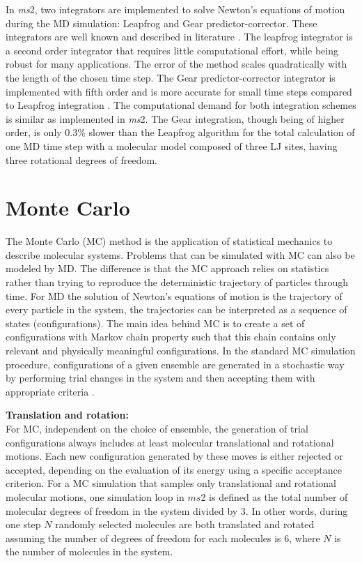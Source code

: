 In \textit{ms}2, two integrators are implemented to solve Newton's equations of motion during the MD simulation: Leapfrog and Gear predictor-corrector. These integrators are well known and described in literature \parencite{Allen}. The leapfrog integrator is a second order integrator that requires little computational effort, while being robust for many applications. The error of the method scales quadratically with the length of the chosen time step. The Gear predictor-corrector integrator is implemented with fifth order and is more accurate for small time steps compared to Leapfrog integration \parencite{Allen}. The computational demand for both integration schemes is similar as implemented in \textit{ms}2. The Gear integration, though being of higher order, is only 0.3\% slower than the Leapfrog algorithm for the total calculation of one MD time step with a molecular model composed of three LJ sites, having three rotational degrees of freedom. 



\section{Monte Carlo}
\label{sec:Monte Carlo}

The Monte Carlo (MC) method is the application of statistical mechanics to describe molecular systems. Problems that can be simulated with MC can also be modeled by MD. The difference is that the MC approach relies on statistics rather than trying to reproduce the deterministic trajectory of particles through time. For MD the solution of Newton's equations of motion is the trajectory of every particle in the system, the trajectories can be interpreted as a sequence of states (configurations). The main idea behind MC is to create a set of configurations with Markov chain property such that this chain contains only relevant and physically meaningful configurations. In the standard MC simulation procedure, configurations of a given ensemble are generated in a stochastic way by performing trial changes in the system and then accepting them with appropriate criteria \parencite{Allen}.


\textbf{Translation and rotation:}\\
For MC, independent on the choice of ensemble, the generation of trial configurations always includes at least molecular translational and rotational motions. Each new configuration generated by these moves is either rejected or accepted, depending on the evaluation of its energy using a specific acceptance criterion. For a MC simulation that samples only translational and rotational molecular motions, one simulation loop in $ms$2 is defined as the total number of molecular degrees of freedom in the system divided by 3. %
In other words, during one step $N$ randomly selected molecules are both translated and rotated assuming the number of degrees of freedom for each molecules is 6, where $N$ is the number of molecules in the system.

